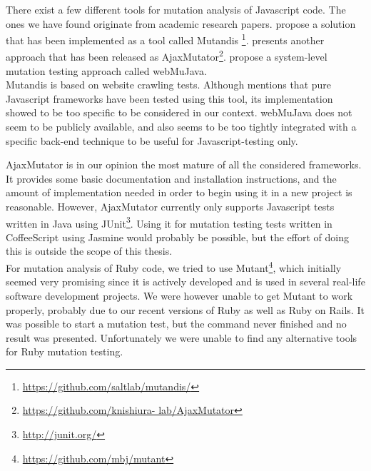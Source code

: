 \label{sec:choices_mutation}

There exist a few different tools for mutation analysis of Javascript
code. The ones we have found originate from academic research papers.
\citet{paper:mutandis} propose a solution that has been implemented as
a tool called Mutandis
\footnote{\url{https://github.com/saltlab/mutandis/}}.
\citet{paper:ajaxmutator} presents another approach that has been
released as AjaxMutator\footnote{\url{https://github.com/knishiura-
lab/AjaxMutator}}. \citet{paper:webmujava} propose a system-level
mutation testing approach called webMuJava.\\

Mutandis is based on website crawling tests. Although
\citeauthor{paper:mutandis} mentions that pure Javascript frameworks
have been tested using this tool, its implementation showed to be too
specific to be considered in our context. webMuJava does not seem to be
publicly available, and also seems to be too tightly integrated with a
specific back-end technique to be useful for Javascript-testing only.

AjaxMutator is in our opinion the most mature of all the considered
frameworks. It provides some basic documentation and installation
instructions, and the amount of implementation needed in order to begin
using it in a new project is reasonable. However, AjaxMutator currently
only supports Javascript tests written in Java using
JUnit\footnote{\url{http://junit.org/}}. Using it for mutation testing
tests written in CoffeeScript using Jasmine would probably be possible,
but the effort of doing this is outside the scope of this thesis.\\

For mutation analysis of Ruby code, we tried to use
Mutant\footnote{\url{https://github.com/mbj/mutant}}, which initially
seemed very promising since it is actively developed and is used in
several real-life software development projects. We were however unable
to get Mutant to work properly, probably due to our recent versions of
Ruby as well as Ruby on Rails. It was possible to start a mutation test,
but the command never finished and no result was presented.
Unfortunately we were unable to find any alternative tools for Ruby
mutation testing.\\
